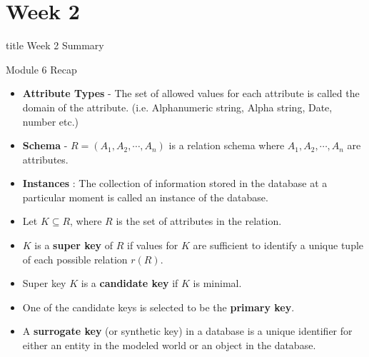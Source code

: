 \documentclass[aspectratio=169, xcolor=dvipsnames]{beamer}
\begin{document}
\section{Week 2}

\begin{frame}
  \vfill
  \centering
  \begin{beamercolorbox}[sep=8pt,center,shadow=true,rounded=true]{title}
    Week 2 Summary\par%
  \end{beamercolorbox}
  \vfill
\end{frame}

\begin{frame}{Module 6 Recap}
    \begin{itemize}[<+->]
        \item \textbf{Attribute Types} - The set of allowed values for each attribute is called the domain of the attribute. (i.e. Alphanumeric string, Alpha string, Date, number etc.)
        \item \textbf{Schema} - $R = (A_1, A_2, \cdots, A_n)$ is a relation schema where $A_1, A_2, \cdots, A_n$ are attributes.
        \item \textbf{Instances} : The collection of information stored in the database at a particular moment is called an instance of the database.
        \item Let $K \subseteq R$, where $R$ is the set of attributes in the relation.
        \item $K$ is a \textbf{super key} of $R$ if values for $K$ are sufficient to identify a unique tuple of each possible relation $r(R)$.
        \item Super key $K$ is a \textbf{candidate key} if $K$ is minimal.
        \item One of the candidate keys is selected to be the \textbf{primary key}.
        \item A \textbf{surrogate key} (or synthetic key) in a database is a unique identifier for either an entity in the modeled world or an object in the database.
    \end{itemize}
\end{frame}
\end{document}
